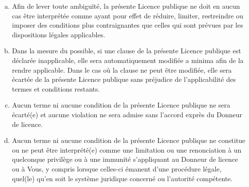 \begin{enumerate}[a.]
\item Afin de lever toute ambiguïté, la présente Licence publique ne doit en aucun cas être interprétée comme ayant pour effet de réduire, limiter, restreindre ou imposer des conditions plus contraignantes que celles qui sont prévues par les dispositions légales applicables.
\item Dans la mesure du possible, si une clause de la présente Licence publique est déclarée inapplicable, elle sera automatiquement modifiée a minima afin de la rendre applicable. Dans le cas où la clause ne peut être modifiée, elle sera écartée de la présente Licence publique sans préjudice de l’applicabilité des termes et conditions restants.
\item Aucun terme ni aucune condition de la présente Licence publique ne sera écarté(e) et aucune violation ne sera admise sans l’accord exprès du Donneur de licence.
\item Aucun terme ni aucune condition de la présente Licence publique ne constitue ou ne peut être interprété(e) comme une limitation ou une renonciation à un quelconque privilège ou à une immunité s’appliquant au Donneur de licence ou à Vous, y compris lorsque celles-ci émanent d’une procédure légale, quel(le) qu’en soit le système juridique concerné ou l’autorité compétente.
\end{enumerate}





































